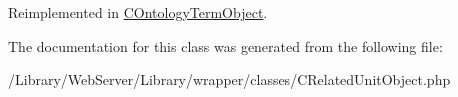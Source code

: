 Reimplemented in \hyperlink{class_c_ontology_term_object_a97ba6103f14e03000996ea6314de6444}{C\-Ontology\-Term\-Object}.



The documentation for this class was generated from the following file\-:\begin{DoxyCompactItemize}
\item 
/\-Library/\-Web\-Server/\-Library/wrapper/classes/C\-Related\-Unit\-Object.\-php\end{DoxyCompactItemize}
